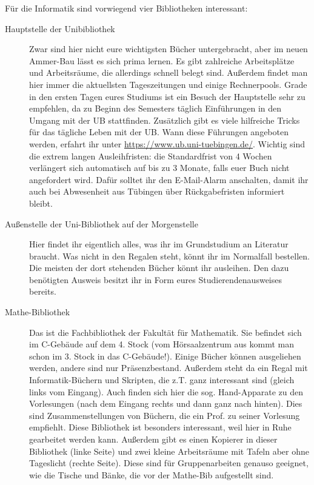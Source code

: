 Für die Informatik sind vorwiegend vier Bibliotheken interessant:
\begin{description}
	\item[Hauptstelle der Unibibliothek] Zwar sind hier nicht eure wichtigsten
	Bücher untergebracht, aber im neuen Ammer-Bau lässt es sich prima
	lernen. Es gibt zahlreiche Arbeitsplätze und Arbeitsräume, die
	allerdings schnell belegt sind. Außerdem findet man hier immer die
	aktuellsten Tageszeitungen und einige Rechnerpools.
	Grade in den ersten Tagen eures Studiums ist ein Besuch der Hauptstelle
	sehr zu empfehlen, da zu Beginn des Semesters täglich Einführungen in den Umgang mit der UB stattfinden. Zusätzlich gibt es viele hilfreiche Tricks für das tägliche Leben mit der UB. Wann diese Führungen angeboten werden, erfahrt ihr unter  \url{https://www.ub.uni-tuebingen.de/}. Wichtig sind die extrem langen Ausleihfristen: die Standardfrist von 4 Wochen verlängert sich automatisch auf bis zu 3 Monate, falls euer Buch nicht angefordert wird. Dafür solltet ihr den E-Mail-Alarm anschalten, damit ihr auch bei Abwesenheit aus Tübingen über Rückgabefristen informiert bleibt. 	%

	\item[Außenstelle der Uni-Bibliothek auf der Morgenstelle]
	Hier findet ihr eigentlich alles, was ihr im Grundstudium an
	Literatur braucht.  Was nicht in den Regalen steht, könnt ihr
	im Normalfall bestellen.  Die meisten der dort stehenden Bücher könnt ihr
	ausleihen. Den dazu benötigten Ausweis besitzt ihr in Form eures Studierendenausweises bereits.
	
	\item[Mathe-Bibliothek]
	Das ist die Fachbibliothek der Fakultät für Mathematik.  Sie
	befindet sich im C-Gebäude auf dem 4. Stock (vom
	Hörsaalzentrum aus kommt man schon im 3. Stock in das
	C-Gebäude!). Einige Bücher können ausgeliehen werden,
	andere sind nur Präsenzbestand.  Außerdem steht da ein Regal
	mit Informatik-Büchern und Skripten, die z.T. ganz
	interessant sind (gleich links vom Eingang).  Auch finden sich
	hier die sog. Hand-Apparate zu den Vorlesungen (nach dem
	Eingang rechts und dann ganz nach hinten).  Dies sind
	Zusammenstellungen von Büchern, die ein Prof. zu seiner
	Vorlesung empfiehlt.  Diese Bibliothek ist besonders
	interessant, weil hier in Ruhe gearbeitet werden kann.
	Außerdem gibt es einen Kopierer in dieser Bibliothek (linke
	Seite) und zwei kleine Arbeitsräume mit Tafeln aber ohne
	Tageslicht (rechte Seite).  Diese sind für Gruppenarbeiten
	genauso geeignet, wie die Tische und Bänke, die vor der
	Mathe-Bib aufgestellt sind.
	

\end{description}
